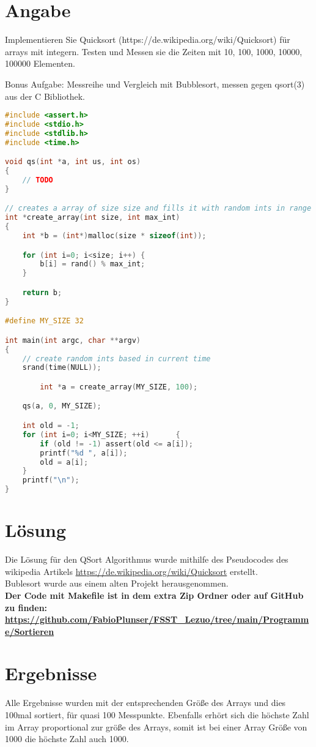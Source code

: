 \newpage
\section{Angabe}
    Implementieren Sie Quicksort (https://de.wikipedia.org/wiki/Quicksort) für arrays mit integern. Testen und Messen sie die Zeiten mit 10, 100, 1000, 10000, 100000 Elementen.

    Bonus Aufgabe: Messreihe und Vergleich mit Bubblesort, messen gegen qsort(3) aus der C Bibliothek.

    \begin{lstlisting}[language=C, style=CStyle, caption=init-CLOCK, captionpos=b, label=init-CLOCK]
#include <assert.h>
#include <stdio.h>
#include <stdlib.h>
#include <time.h>

void qs(int *a, int us, int os)
{
	// TODO
}

// creates a array of size size and fills it with random ints in range 0 to max_int
int *create_array(int size, int max_int)
{
	int *b = (int*)malloc(size * sizeof(int));

	for (int i=0; i<size; i++) {
		b[i] = rand() % max_int;
	}

	return b;
}

#define MY_SIZE 32

int main(int argc, char **argv)
{
	// create random ints based in current time
	srand(time(NULL));

        int *a = create_array(MY_SIZE, 100);

	qs(a, 0, MY_SIZE);

	int old = -1;
	for (int i=0; i<MY_SIZE; ++i)      {
		if (old != -1) assert(old <= a[i]);
		printf("%d ", a[i]);
		old = a[i];
	}
	printf("\n");
}
        \end{lstlisting}

\section{Lösung}
    Die Lösung für den QSort Algorithmus wurde mithilfe des Pseudocodes des wikipedia Artikels \url{https://de.wikipedia.org/wiki/Quicksort} erstellt.\\
    Bublesort wurde aus einem alten Projekt herausgenommen.\\   
    \textbf{Der Code mit Makefile ist in dem extra Zip Ordner oder auf GitHub zu finden: \url{https://github.com/FabioPlunser/FSST_Lezuo/tree/main/Programme/Sortieren}}
\section{Ergebnisse}
    Alle Ergebnisse wurden mit der entsprechenden Größe des Arrays und dies 100mal sortiert, für quasi 100 Messpunkte.
    Ebenfalls erhört sich die höchste Zahl im Array proportional zur größe des Arrays, somit ist bei einer Array Größe von 1000 die höchste
    Zahl auch 1000.
    
